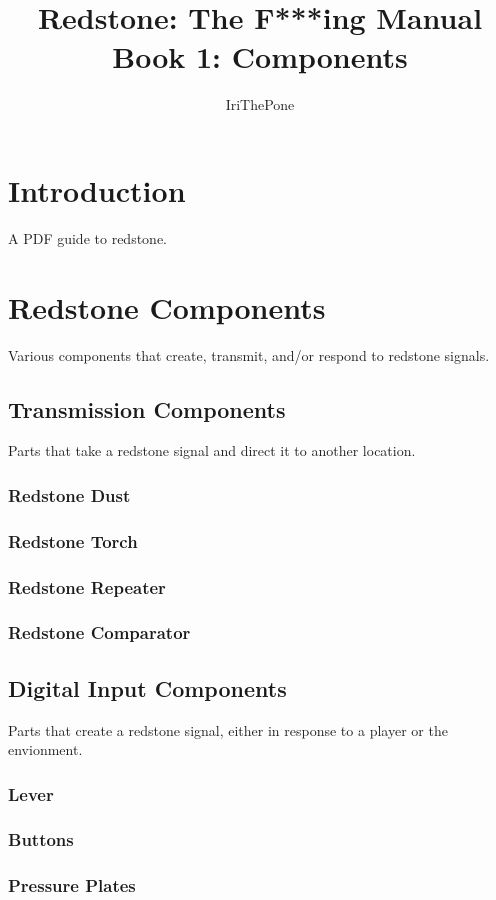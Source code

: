 \documentclass[12pt]{article}
\title{Redstone: The F***ing Manual\\{\Large Book 1: Components}}
\author{IriThePone}
\begin{document}
\maketitle
\pagebreak
\tableofcontents
\pagebreak

\section{Introduction}
A PDF guide to redstone.
\pagebreak

\section{Redstone Components}
Various components that create, transmit, and/or respond to redstone signals.  
\subsection{Transmission Components}
Parts that take a redstone signal and direct it to another location.
\subsubsection{Redstone Dust}
\subsubsection{Redstone Torch}
\subsubsection{Redstone Repeater}
\subsubsection{Redstone Comparator}

\pagebreak

\subsection{Digital Input Components}
Parts that create a redstone signal, either in response to a player or the envionment.
\subsubsection{Lever}
\subsubsection{Buttons}
\subsubsection{Pressure Plates}
\end{document}
